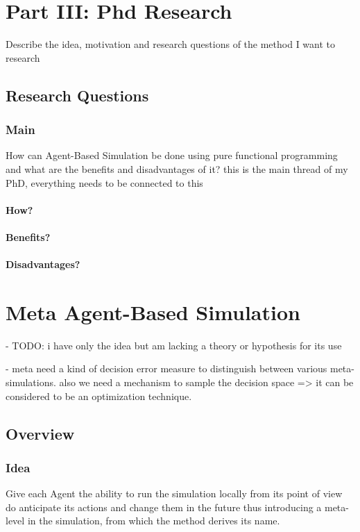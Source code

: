 \section{Part III: Phd Research} 
Describe the idea, motivation and research questions of the method I want to research 
 
\subsection{Research Questions} 

\subsubsection{Main} How can Agent-Based Simulation be done using pure functional programming and what are the benefits and disadvantages of it?
this is the main thread of my PhD, everything needs to be connected to this

\paragraph{How?}
\paragraph{Benefits?}
\paragraph{Disadvantages?}



\section{Meta Agent-Based Simulation}
- TODO:  i have only the idea but am lacking a theory or hypothesis for its use

- meta need a kind of decision error measure to distinguish between various meta-simulations. also we need a mechanism to sample the decision space => it can be considered to be an optimization technique.

\subsection{Overview}
\subsubsection{Idea} Give each  Agent the ability to run the simulation locally from its point of view do anticipate its actions and change them in the future thus introducing a meta-level in the simulation, from which the method derives its name.
